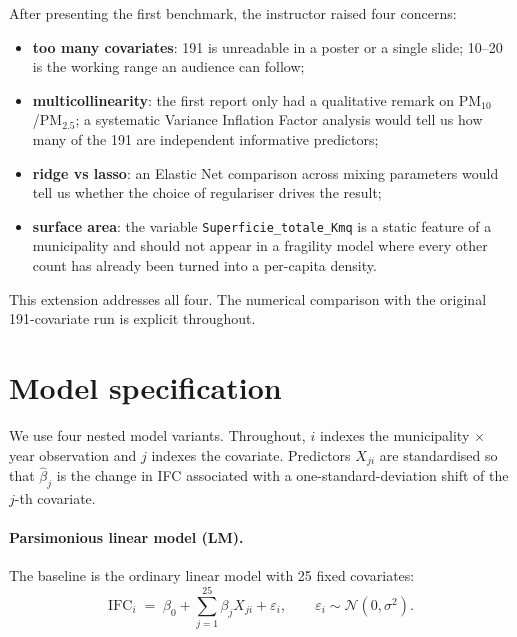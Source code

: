 \documentclass[11pt,a4paper]{article}
\begin{document}
After presenting the first benchmark, the instructor raised four
concerns:
\begin{itemize}[leftmargin=2em]
  \item \textbf{too many covariates}: 191 is unreadable in a poster or
    a single slide; 10--20 is the working range an audience can
    follow;
  \item \textbf{multicollinearity}: the first report only had a
    qualitative remark on PM$_{10}$/PM$_{2.5}$; a systematic Variance
    Inflation Factor analysis would tell us how many of the 191 are
    independent informative predictors;
  \item \textbf{ridge vs lasso}: an Elastic Net comparison across
    mixing parameters would tell us whether the choice of regulariser
    drives the result;
  \item \textbf{surface area}: the variable
    \texttt{Superficie\_totale\_Kmq} is a static feature of a
    municipality and should not appear in a fragility model where
    every other count has already been turned into a per-capita
    density.
\end{itemize}
This extension addresses all four. The numerical comparison with the
original 191-covariate run is explicit throughout.

\section{Model specification}

We use four nested model variants. Throughout, $i$ indexes the
municipality $\times$ year observation and $j$ indexes the covariate.
Predictors $X_{ji}$ are standardised so that $\hat\beta_j$ is the
change in IFC associated with a one-standard-deviation shift of the
$j$-th covariate.

\paragraph{Parsimonious linear model (LM).}
The baseline is the ordinary linear model with 25 fixed covariates:
\begin{equation}
  \mathrm{IFC}_i \;=\; \beta_0 + \sum_{j=1}^{25} \beta_j X_{ji}
                       + \varepsilon_i,
  \qquad \varepsilon_i \sim \mathcal{N}(0,\sigma^2).
  \label{eq:lm}
\end{equation}
\end{document}
